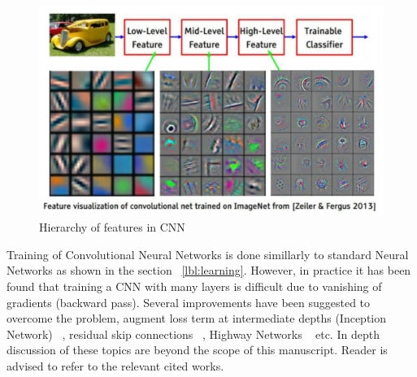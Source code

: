 \begin{figure}[H]
	\centering
   \includegraphics[scale=0.36]{figures/intro/features.png}
   \caption[Hierarchy of features]{Hierarchy of features in CNN}
   \label{fig:features}
\end{figure}

Training of Convolutional Neural Networks is done simillarly to standard Neural Networks as shown in the section ~\ref{lbl:learning}. However, in practice it has been found that training a CNN with many layers is difficult due to vanishing of gradients (backward pass). Several improvements have been suggested to overcome the problem, augment loss term at intermediate depths (Inception Network) ~\cite{Szegedy2016RethinkingTI}, residual skip connections ~\cite{he2016deep}, Highway Networks ~\cite{srivastava2015highway} etc. In depth discussion of these topics are beyond the scope of this manuscript. Reader is advised to refer to the relevant cited works.